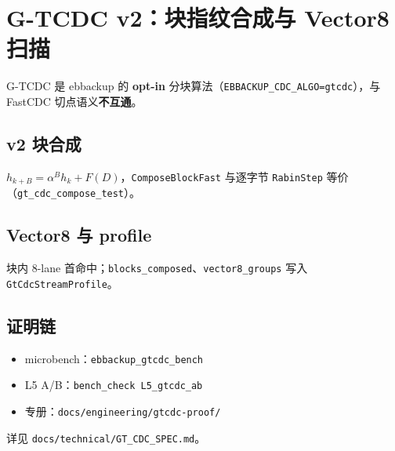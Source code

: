 \chapter{G-TCDC v2：块指纹合成与 Vector8 扫描}
\label{ch:gtcdc}

G-TCDC 是 ebbackup 的 \textbf{opt-in} 分块算法（\texttt{EBBACKUP\_CDC\_ALGO=gtcdc}），与 FastCDC 切点语义\textbf{不互通}。

\section{v2 块合成}

$h_{k+B}=\alpha^B h_k + F(D)$，\texttt{ComposeBlockFast} 与逐字节 \texttt{RabinStep} 等价（\texttt{gt\_cdc\_compose\_test}）。

\section{Vector8 与 profile}

块内 8-lane 首命中；\texttt{blocks\_composed}、\texttt{vector8\_groups} 写入 \texttt{GtCdcStreamProfile}。

\section{证明链}

\begin{itemize}[nosep]
  \item microbench：\texttt{ebbackup\_gtcdc\_bench}
  \item L5 A/B：\texttt{bench\_check L5\_gtcdc\_ab}
  \item 专册：\texttt{docs/engineering/gtcdc-proof/}
\end{itemize}

详见 \texttt{docs/technical/GT\_CDC\_SPEC.md}。
